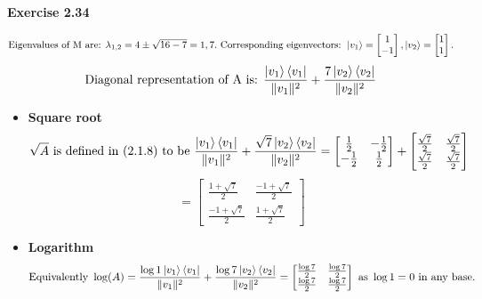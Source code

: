 \documentclass{article}
\begin{document}
\begin{framed}
    \noindent \textbf{Exercise 2.34}
    
    \medskip
    $$
    \text{Eigenvalues of M are: } \lambda_{1,2} = 4 \pm \sqrt{16 - 7} = 1,7. \text{ Corresponding eigenvectors: }\ket{v_1}=\begin{bmatrix}1 \\ -1\end{bmatrix}, \ket{v_2} = \begin{bmatrix}1 \\ 1\end{bmatrix}.
    $$
    $$
    \text{Diagonal representation of A is: } \frac{\ket{v_1}\bra{v_1}}{\|v_1\|^{2}} + \frac{7\ket{v_2}\bra{v_2}}{\|v_2\|^{2}}
    $$
    \begin{itemize}
        \item \textbf{Square root}
        $$
        \sqrt{A} \text{ is defined in (2.1.8) to be } \frac{\ket{v_1}\bra{v_1}}{\|v_1\|^{2}} + \frac{\sqrt{7}\ket{v_2}\bra{v_2}}{\|v_2\|^{2}} = \begin{bmatrix}\frac{1}{2} & -\frac{1}{2}\\ -\frac{1}{2} & \frac{1}{2}\end{bmatrix} + \begin{bmatrix}\frac{\sqrt{7}}{2} & \frac{\sqrt{7}}{2} \\ \frac{\sqrt{7}}{2} & \frac{\sqrt{7}}{2}\end{bmatrix}
        $$
        $$
        = \begin{bmatrix}\frac{1 + \sqrt{7}}{2} & \frac{-1 + \sqrt{7}}{2} \\ \frac{-1 + \sqrt{7}}{2} & \frac{1 + \sqrt{7}}{2}\end{bmatrix}
        $$
        \item \textbf{Logarithm}
        $$
        \text{Equivalently } \log(A) =  \frac{\log{1}\ket{v_1}\bra{v_1}}{\|v_1\|^{2}} + \frac{\log{7}\ket{v_2}\bra{v_2}}{\|v_2\|^{2}} = \begin{bmatrix}\frac{\log{7}}{2} & \frac{\log{7}}{2} \\ \frac{\log{7}}{2} & \frac{\log{7}}{2}\end{bmatrix} \text{ as }\log{1} = 0 \text{ in any base}.
        $$
    \end{itemize}
    
\end{framed}

\bigskip
\end{document}
